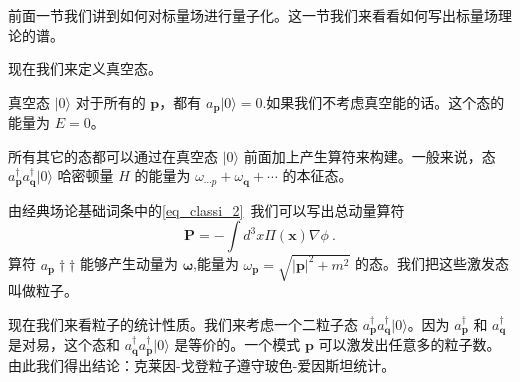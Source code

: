 
前面一节我们讲到如何对标量场进行量子化。这一节我们来看看如何写出标量场理论的谱。

现在我们来定义真空态。
\begin{definition}{真空态 $|0\rangle$}
对于所有的 $\mathbf p$，都有 $a_{\mathbf p}|0\rangle=0$.如果我们不考虑真空能的话。这个态的能量为 $E=0$。
\end{definition}
所有其它的态都可以通过在真空态 $|0\rangle$ 前面加上产生算符来构建。一般来说，态 $a^\dagger_{\mathbf p}a^\dagger_{\mathbf q}|0\rangle$ 哈密顿量 $H$ 的能量为 $\omega_{\mathbf\cdots p}+\omega_{\mathbf q}+\cdots$ 的本征态。

由经典场论基础词条中的\autoref{eq_classi_2}~我们可以写出总动量算符
\begin{equation}
\mathbf P = -\int d^3 x \Pi(\mathbf x)  \nabla \phi ~.
\end{equation}
算符 $a_{\mathbf p}\dagger\dagger$ 能够产生动量为 $\mathbf \omega$,能量为 $\omega_{\mathbf p} = \sqrt{|\mathbf p|^2+m^2}$ 的态。我们把这些激发态叫做粒子。

现在我们来看粒子的统计性质。我们来考虑一个二粒子态 $a^\dagger_{\mathbf  p}a^\dagger_{\mathbf q}| 0 \rangle$。因为 $a^\dagger_{\mathbf p}$ 和 $a^\dagger_{\mathbf q}$ 是对易，这个态和 $a^\dagger_{\mathbf q}a^\dagger_{\mathbf p}| 0 \rangle$ 是等价的。一个模式 $\mathbf p$ 可以激发出任意多的粒子数。由此我们得出结论：克莱因-戈登粒子遵守玻色-爱因斯坦统计。

